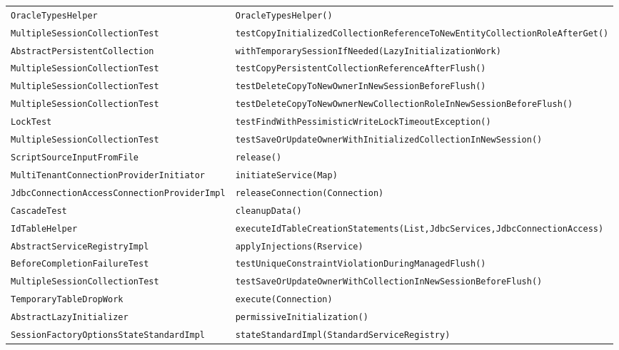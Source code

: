 \begin{center}
\begin{longtable}{ll}
\lstinline/OracleTypesHelper/&{\lstinline/OracleTypesHelper()/}\\
\lstinline/MultipleSessionCollectionTest/&{\lstinline/testCopyInitializedCollectionReferenceToNewEntityCollectionRoleAfterGet()/}\\
\lstinline/AbstractPersistentCollection/&{\lstinline/withTemporarySessionIfNeeded(LazyInitializationWork)/}\\
\lstinline/MultipleSessionCollectionTest/&{\lstinline/testCopyPersistentCollectionReferenceAfterFlush()/}\\
\lstinline/MultipleSessionCollectionTest/&{\lstinline/testDeleteCopyToNewOwnerInNewSessionBeforeFlush()/}\\
\lstinline/MultipleSessionCollectionTest/&{\lstinline/testDeleteCopyToNewOwnerNewCollectionRoleInNewSessionBeforeFlush()/}\\
\lstinline/LockTest/&{\lstinline/testFindWithPessimisticWriteLockTimeoutException()/}\\
\lstinline/MultipleSessionCollectionTest/&{\lstinline/testSaveOrUpdateOwnerWithInitializedCollectionInNewSession()/}\\
\lstinline/ScriptSourceInputFromFile/&{\lstinline/release()/}\\
\lstinline/MultiTenantConnectionProviderInitiator/&{\lstinline/initiateService(Map)/}\\
\lstinline/JdbcConnectionAccessConnectionProviderImpl/&{\lstinline/releaseConnection(Connection)/}\\
\lstinline/CascadeTest/&{\lstinline/cleanupData()/}\\
\lstinline/IdTableHelper/&{\lstinline/executeIdTableCreationStatements(List,JdbcServices,JdbcConnectionAccess)/}\\
\lstinline/AbstractServiceRegistryImpl/&{\lstinline/applyInjections(Rservice)/}\\
\lstinline/BeforeCompletionFailureTest/&{\lstinline/testUniqueConstraintViolationDuringManagedFlush()/}\\
\lstinline/MultipleSessionCollectionTest/&{\lstinline/testSaveOrUpdateOwnerWithCollectionInNewSessionBeforeFlush()/}\\
\lstinline/TemporaryTableDropWork/&{\lstinline/execute(Connection)/}\\
\lstinline/AbstractLazyInitializer/&{\lstinline/permissiveInitialization()/}\\
\lstinline/SessionFactoryOptionsStateStandardImpl/&{\lstinline/stateStandardImpl(StandardServiceRegistry)/}\\

\end{longtable}
\end{center}
